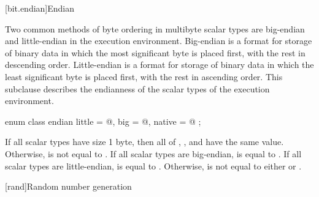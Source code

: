 [bit.endian]{Endian}

\pnum
Two common methods of byte ordering in multibyte scalar types are big-endian
and little-endian in the execution environment. Big-endian is a format for
storage of binary data in which the most significant byte is placed first,
with the rest in descending order. Little-endian is a format for storage of
binary data in which the least significant byte is placed first, with the rest
in ascending order. This subclause describes the endianness of the scalar types
of the execution environment.

%
%
%
%
\begin{itemdecl}
enum class endian {
  little = @\seebelow@,
  big    = @\seebelow@,
  native = @\seebelow@
};
\end{itemdecl}

\begin{itemdescr}
\pnum
If all scalar types have size 1 byte, then all of ,
, and  have the same value.
Otherwise,  is not equal to .
If all scalar types are big-endian,  is
equal to .
If all scalar types are little-endian,  is
equal to .
Otherwise,  is not equal
to either  or .
\end{itemdescr}


[rand]{Random number generation}

